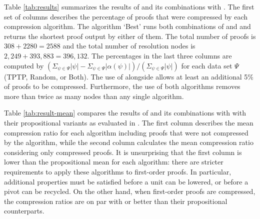 {Table \ref{tab:results} summarizes the results of {\FORPI} and its combinations with {\GFOLU}. The first set of columns describes the percentage of proofs that were compressed by each compression algorithm. The algorithm `Best' runs both combinations of {\GFOLU} and {\FORPI} and returns the shortest proof output by either of them. The total number of proofs is $308+2280=2588$ and the total number of resolution nodes is $2,249 + 393,883
= 396,132$. The percentages in the last three columns are computed by $(\Sigma_{\psi \in \Psi} |\psi|  - \Sigma_{\psi\in \Psi} |\alpha(\psi)|)/(\Sigma_{\psi \in \Psi} |\psi|)$ for each data set $\Psi$ (TPTP, Random, or Both). The use of {\FORPI} alongside {\GFOLU} allows at least an additional 5\% of proofs to be compressed. Furthermore, the use of both algorithms removes more than twice as many nodes than any single algorithm.

Table \ref{tab:result-mean} compares the results of {\FORPI} and its combinations with {\GFOLU} with their propositional variants as evaluated in  \cite{Boudou}. The first column describes the mean compression ratio for each algorithm including proofs that were not compressed by the algorithm, while the second column calculates the mean compression ratio considering only compressed proofs. It is unsurprising that the first column is lower than the propositional mean for each algorithm: there are stricter requirements to apply these algorithms to first-order proofs. In particular, additional properties must be satisfied before a unit can be lowered, or before a pivot can be recycled. On the other hand, when first-order proofs are compressed, the compression ratios are on par with or better than their propositional counterparts.

\begin{figure}[p]
    

\end{figure}}
